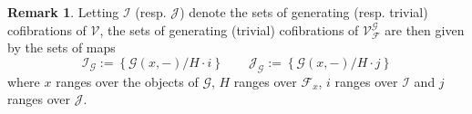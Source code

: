 \documentclass[a4paper,10pt
,draft
]{article}%
\numberwithin{equation}{section}
\numberwithin{figure}{section}
\newtheorem{theorem}[equation]{Theorem}%
\theoremstyle{definition} %
\newtheorem{definition}[equation]{Definition}%
\newtheorem{remark}[equation]{Remark}%
\newcommand{\F}{\ensuremath{\mathcal F}}
\newcommand{\V}{\ensuremath{\mathcal V}}
\newcommand{\G}{\ensuremath{\mathcal G}}
\newcommand{\1}{\ensuremath{\mathbbm 1}}%
\begin{document}







\begin{remark}\label{VGFGEN REM}
	Letting $\mathcal{I}$ (resp. $\mathcal{J}$)
	denote the sets of generating (resp. trivial) cofibrations of 
	$\V$, the sets of generating (trivial) cofibrations of $\V^{\G}_{\F}$ are then given by the sets of maps
\begin{equation}\label{VGFGEN EQ}
      \mathcal I_\G := \left\{
            \G(x,-)/H \cdot i
      \right\}
      \qquad
      \mathcal J_\G := \left\{
            \G(x,-)/H \cdot j
      \right\}
\end{equation}
where $x$ ranges over the objects of $\G$, $H$ ranges over $\F_x$,
$i$ ranges over $\mathcal{I}$ and 
$j$ ranges over $\mathcal{J}$.
\end{remark}
\end{document}
